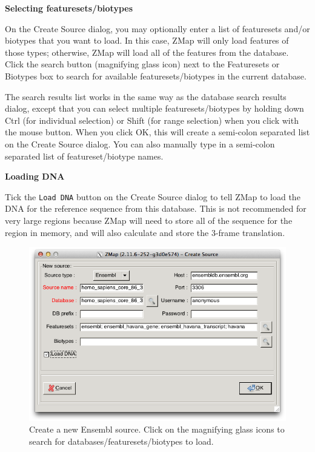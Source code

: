 \documentclass[letterpaper]{article}
\begin{document}
\textbf{Selecting featuresets/biotypes}

On the Create Source dialog, you may optionally enter a list of featuresets and/or biotypes that you want to load. In this case, ZMap will only load features of those types; otherwise, ZMap will load all of the features from the database. Click the search button (magnifying glass icon) next to the Featuresets or Biotypes box to search for available featuresets/biotypes in the current database.

The search results list works in the same way as the database search results dialog, except that you can select multiple featuresets/biotypes by holding down Ctrl (for individual selection) or Shift (for range selection) when you click with the mouse button. When you click OK, this will create a semi-colon separated list on the Create Source dialog. You can also manually type in a semi-colon separated list of featureset/biotype names.

\textbf{Loading DNA}

Tick the \lstinline{Load DNA} button on the Create Source dialog to tell ZMap to load the DNA for the reference sequence from this database. This is not recommended for very large regions because ZMap will need to store all of the sequence for the region in memory, and will also calculate and store the 3-frame translation.

\begin{figure}
\centering
\color[rgb]{0.30980393,0.5058824,0.7411765}
\includegraphics[resolution=150]{images/create_source_ensembl.png}
\caption{Create a new Ensembl source. Click on the magnifying glass icons to search for databases/featuresets/biotypes to load.}
\label{img_create_source_ensembl}
\end{figure}
\end{document}
